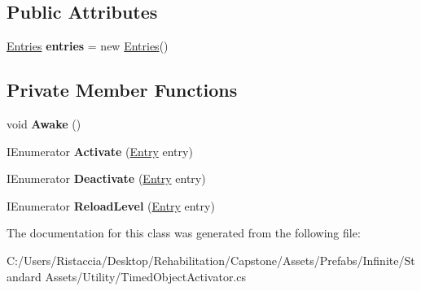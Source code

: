 \subsection*{Public Attributes}
\begin{DoxyCompactItemize}
\item 
\mbox{\label{class_unity_standard_assets_1_1_utility_1_1_timed_object_activator_a9a83bb800381f78d7701ebb24cc58b7a}} 
\hyperlink{class_unity_standard_assets_1_1_utility_1_1_timed_object_activator_1_1_entries}{Entries} {\bfseries entries} = new \hyperlink{class_unity_standard_assets_1_1_utility_1_1_timed_object_activator_1_1_entries}{Entries}()
\end{DoxyCompactItemize}
\subsection*{Private Member Functions}
\begin{DoxyCompactItemize}
\item 
\mbox{\label{class_unity_standard_assets_1_1_utility_1_1_timed_object_activator_ac80433e7d7fffe0799f31e9907e1db67}} 
void {\bfseries Awake} ()
\item 
\mbox{\label{class_unity_standard_assets_1_1_utility_1_1_timed_object_activator_aa49671cb4daa576e09b294d9118f950b}} 
I\+Enumerator {\bfseries Activate} (\hyperlink{class_unity_standard_assets_1_1_utility_1_1_timed_object_activator_1_1_entry}{Entry} entry)
\item 
\mbox{\label{class_unity_standard_assets_1_1_utility_1_1_timed_object_activator_a80dcfdf19c38cac04b61739985542c6e}} 
I\+Enumerator {\bfseries Deactivate} (\hyperlink{class_unity_standard_assets_1_1_utility_1_1_timed_object_activator_1_1_entry}{Entry} entry)
\item 
\mbox{\label{class_unity_standard_assets_1_1_utility_1_1_timed_object_activator_a8729302c65dbc0234700d179a08b15a4}} 
I\+Enumerator {\bfseries Reload\+Level} (\hyperlink{class_unity_standard_assets_1_1_utility_1_1_timed_object_activator_1_1_entry}{Entry} entry)
\end{DoxyCompactItemize}


The documentation for this class was generated from the following file\+:\begin{DoxyCompactItemize}
\item 
C\+:/\+Users/\+Ristaccia/\+Desktop/\+Rehabilitation/\+Capstone/\+Assets/\+Prefabs/\+Infinite/\+Standard Assets/\+Utility/Timed\+Object\+Activator.\+cs\end{DoxyCompactItemize}
